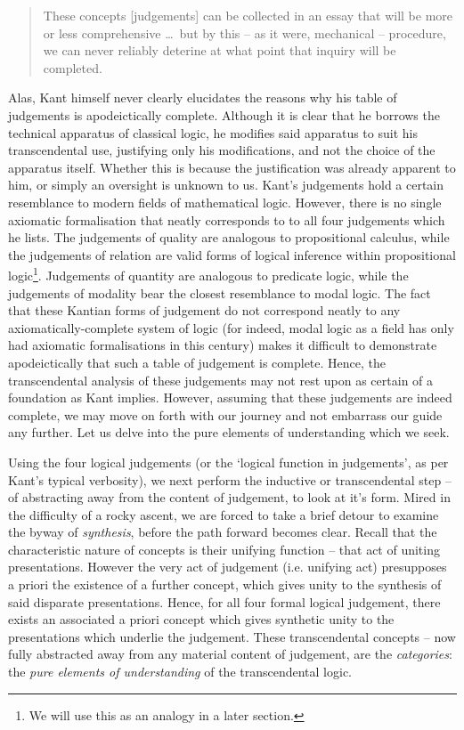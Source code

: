 \begin{quote}
  These concepts [judgements] can be collected in an essay that will be more or less comprehensive \ldots\ but by this -- as it were, mechanical -- procedure, we can never reliably deterine at what point that inquiry will be completed.

  \autocite[B92]{hackett}
\end{quote}

\noindent
Alas, Kant himself never clearly elucidates the reasons why his table of judgements is apodeictically complete. Although it is clear that he borrows the technical apparatus of classical logic, he modifies said apparatus to suit his transcendental use, justifying only his modifications, and not the choice of the apparatus itself. Whether this is because the justification was already apparent to him, or simply an oversight is unknown to us. Kant's judgements hold a certain resemblance to modern fields of mathematical logic. However, there is no single axiomatic formalisation that neatly corresponds to to all four judgements which he lists. The judgements of quality are analogous to propositional calculus, while the judgements of relation are valid forms of logical inference within propositional logic\footnote{We will use this as an analogy in a later section.}. Judgements of quantity are analogous to predicate logic, while the judgements of modality bear the closest resemblance to modal logic. The fact that these Kantian forms of judgement do not correspond neatly to any axiomatically-complete system of logic (for indeed, modal logic as a field has only had axiomatic formalisations in this century) makes it difficult to demonstrate apodeictically that such a table of judgement is complete. Hence, the transcendental analysis of these judgements may not rest upon as certain of a foundation as Kant implies. However, assuming that these judgements are indeed complete, we may move on forth with our journey and not embarrass our guide any further. Let us delve into the pure elements of understanding which we seek.

Using the four logical judgements (or the `logical function in judgements', as per Kant's typical verbosity), we next perform the inductive or transcendental step -- of abstracting away from the content of judgement, to look at it's form. Mired in the difficulty of a rocky ascent, we are forced to take a brief detour to examine the byway of \emph{synthesis}, before the path forward becomes clear. Recall that the characteristic nature of concepts is their unifying function -- that act of uniting presentations. However the very act of judgement (i.e. unifying act) presupposes a priori the existence of a further concept, which gives unity to the synthesis of said disparate presentations. Hence, for all four formal logical judgement, there exists an associated a priori concept which gives synthetic unity to the presentations which underlie the judgement. These transcendental concepts -- now fully abstracted away from any material content of judgement, are the \emph{categories}: the \emph{pure elements of understanding} of the transcendental logic.

